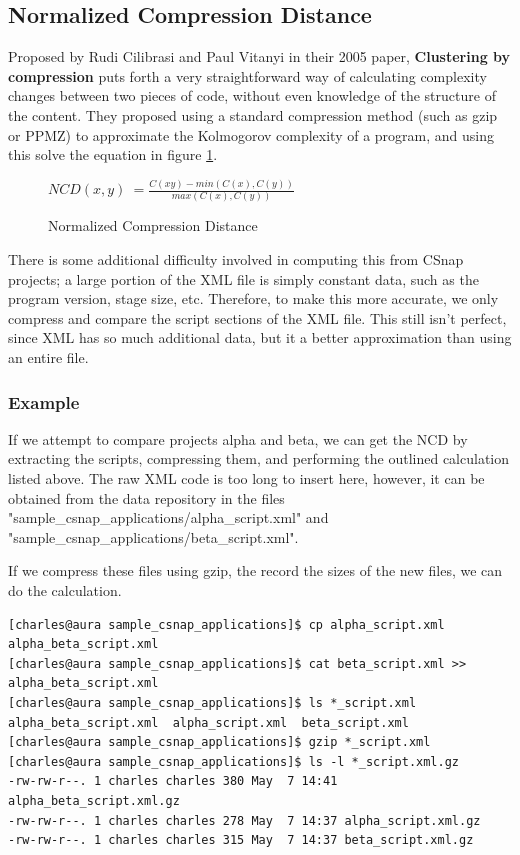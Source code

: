 \documentclass[]{article}
\begin{document}
\subsection{Normalized Compression Distance}

Proposed by Rudi Cilibrasi and Paul Vitanyi in their 2005 paper, \textbf{Clustering by compression} \cite{ref:cilibrasi2005clustering} puts forth a very straightforward way of calculating complexity changes between two pieces of code, without even knowledge of the structure of the content.
They proposed using a standard compression method (such as gzip or PPMZ) to approximate the Kolmogorov complexity of a program, and using this solve the equation in figure \ref{ncd_eq_1}.


\begin{figure}[h]
	\caption{Normalized Compression Distance}
	\label{ncd_eq_1}
	\centering
	$NCD(x,y) ~= \frac{C(xy) - min(C(x),C(y))}{max(C(x),C(y))}$
\end{figure}

There is some additional difficulty involved in computing this from CSnap projects; a large portion of the XML file is simply constant data, such as the program version, stage size, etc.
Therefore, to make this more accurate, we only compress and compare the script sections of the XML file.
This still isn't perfect, since XML has so much additional data, but it a better approximation than using an entire file.

\subsubsection{Example}

If we attempt to compare projects alpha and beta, we can get the NCD by extracting the scripts, compressing them, and performing the outlined calculation listed above.
The raw XML code is too long to insert here, however, it can be obtained from the data repository in the files "sample\_csnap\_applications/alpha\_script.xml" and "sample\_csnap\_applications/beta\_script.xml".

If we compress these files using gzip, the record the sizes of the new files, we can do the calculation.

\begin{lstlisting}
[charles@aura sample_csnap_applications]$ cp alpha_script.xml alpha_beta_script.xml
[charles@aura sample_csnap_applications]$ cat beta_script.xml >> alpha_beta_script.xml
[charles@aura sample_csnap_applications]$ ls *_script.xml
alpha_beta_script.xml  alpha_script.xml  beta_script.xml
[charles@aura sample_csnap_applications]$ gzip *_script.xml
[charles@aura sample_csnap_applications]$ ls -l *_script.xml.gz
-rw-rw-r--. 1 charles charles 380 May  7 14:41 alpha_beta_script.xml.gz
-rw-rw-r--. 1 charles charles 278 May  7 14:37 alpha_script.xml.gz
-rw-rw-r--. 1 charles charles 315 May  7 14:37 beta_script.xml.gz

\end{lstlisting}
\end{document}
